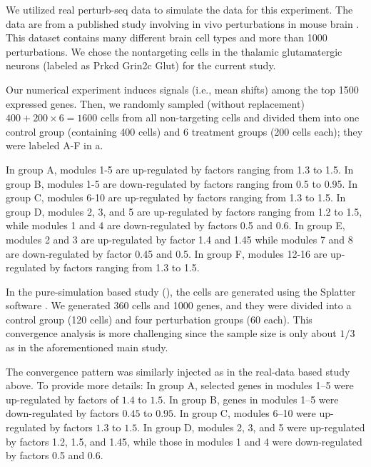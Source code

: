 \documentclass[11pt]{article}
\newenvironment{revblockr3}
  {\color[RGB]{210,110,110}}
  {}
\begin{document}
\begin{revblockr3}
We utilized real perturb-seq data to simulate the data for this experiment.  The data are from a published study involving in vivo perturbations in mouse brain \cite{shi2026genome}. This dataset contains many different brain cell types and more than 1000 perturbations. We chose the nontargeting cells in the thalamic glutamatergic neurons (labeled as Prkcd Grin2c Glut) for the current study.

Our numerical experiment induces signals (i.e., mean shifts) among the top 1500 expressed genes. Then, we randomly sampled (without replacement) $400+200\times6=1600$ cells from all non-targeting cells and divided them into one control group (containing 400 cells) and 6 treatment groups (200 cells each); they were labeled A-F in a.

In group A, modules 1-5 are up-regulated by factors ranging from 1.3 to 1.5. In group B, modules 1-5 are down-regulated by factors ranging from 0.5 to 0.95. In group C, modules 6-10 are up-regulated by factors ranging from 1.3 to 1.5. In group D, modules 2, 3, and 5 are up-regulated by factors ranging from 1.2 to 1.5, while modules 1 and 4 are down-regulated by factors 0.5 and 0.6. In group E, modules 2 and 3 are up-regulated by factor 1.4 and 1.45 while modules 7 and 8 are down-regulated by factor 0.45 and 0.5. In group F, modules 12-16 are up-regulated by factors ranging from 1.3 to 1.5.

In the pure-simulation based study (), the cells are generated using the Splatter software \cite{zappia2017splatter}. We generated 360 cells and 1000 genes, and they were divided into a control group (120 cells) and four perturbation groups (60 each). This convergence analysis is more challenging since the sample size is only about $1/3$ as in the aforementioned main study.

The convergence pattern was similarly injected as in the real-data based study above. To provide more details: In group A, selected genes in modules 1–5 were up-regulated by factors of $1.4$ to $1.5$. In group B, genes in modules 1–5 were down-regulated by factors $0.45$ to $0.95$. In group C, modules 6–10 were up-regulated by factors $1.3$ to $1.5$. In group D, modules 2, 3, and 5 were up-regulated by factors 1.2, 1.5, and 1.45, while those in modules 1 and 4 were down-regulated by factors 0.5 and 0.6.
\end{revblockr3}

\newpage
\end{document}
